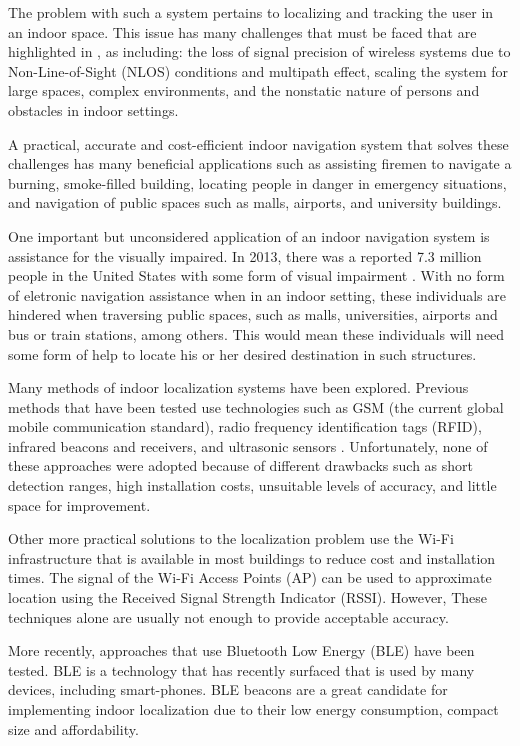 \documentclass[conference]{IEEEtran}
\begin{document}
The problem with such a system pertains to localizing and tracking the user in an indoor space. This issue has many challenges that must be faced that are highlighted in \cite{mainetti2014survey}, as including: the loss of signal precision of wireless systems due to Non-Line-of-Sight (NLOS) conditions and multipath effect, scaling the system for large spaces, complex environments, and the nonstatic nature of persons and obstacles in indoor settings.

A practical, accurate and cost-efficient indoor navigation system that solves these challenges has many beneficial applications such as assisting firemen to navigate a burning, smoke-filled building, locating people in danger in emergency situations, and navigation of public spaces such as malls, airports, and university buildings.

One important but unconsidered application of an indoor navigation system is assistance for the visually impaired. In 2013, there was a reported 7.3 million people in the United States with some form of visual impairment \cite{NFB}. With no form of eletronic navigation assistance when in an indoor setting, these individuals are hindered when traversing public spaces, such as malls, universities, airports and bus or train stations, among others. This would mean these individuals will need some form of help to locate his or her desired destination in such structures.

Many methods of indoor localization systems have been explored. Previous methods that have been tested use technologies such as GSM (the current global mobile communication standard), radio frequency identification tags (RFID), infrared beacons and receivers, and ultrasonic sensors \cite{otsason2005accurate,li2011performance,liu2014survey,ward1997new,medina2013ultrasound}. Unfortunately, none of these approaches were adopted because of different drawbacks such as short detection ranges, high installation costs, unsuitable levels of accuracy, and little space for improvement.

Other more practical solutions to the localization problem use the Wi-Fi infrastructure that is available in most buildings to reduce cost and installation times. The signal of the Wi-Fi Access Points (AP) can be used to approximate location using the Received Signal Strength Indicator (RSSI). However, These techniques alone are usually not enough to provide acceptable accuracy.

More recently, approaches that use Bluetooth Low Energy (BLE) have been tested. BLE is a technology that has recently surfaced that is used by many devices, including smart-phones. BLE beacons are a great candidate for implementing indoor localization due to their low energy consumption, compact size and affordability.
\end{document}
